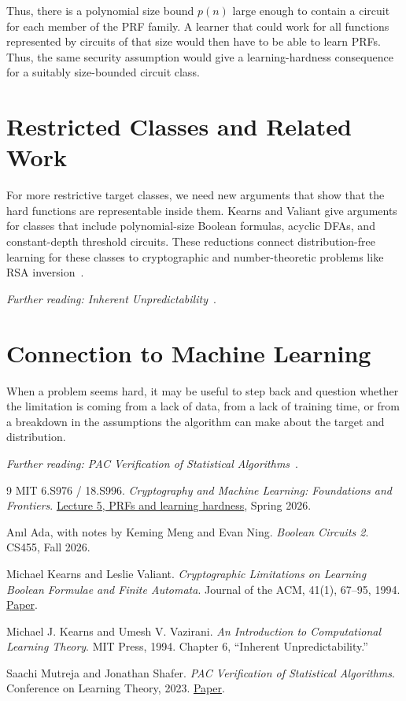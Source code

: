\documentclass[11pt,fleqn]{article}
\begin{document}
Thus, there is a polynomial size bound $p(n)$ large enough to contain a circuit for each member of the PRF family. A learner that could work for all functions represented by circuits of that size would then have to be able to learn PRFs. Thus, the same security assumption would give a learning-hardness consequence for a suitably size-bounded circuit class.

\section{Restricted Classes and Related Work}

For more restrictive target classes, we need new arguments that show that the hard functions are representable inside them. Kearns and Valiant give arguments for classes that include polynomial-size Boolean formulas, acyclic DFAs, and constant-depth threshold circuits. These reductions connect distribution-free learning for these classes to cryptographic and number-theoretic problems like RSA inversion~\cite{valiant}.

\emph{Further reading: Inherent Unpredictability}~\cite{vazirani}.

\section{Connection to Machine Learning}

When a problem seems hard, it may be useful to step back and question whether the limitation is coming from a lack of data, from a lack of training time, or from a breakdown in the assumptions the algorithm can make about the target and distribution.

\emph{Further reading: PAC Verification of Statistical Algorithms}~\cite{verification}.

\begin{thebibliography}{9}
MIT 6.S976 / 18.S996.
\emph{Cryptography and Machine Learning: Foundations and Frontiers}.
\href{https://mlcrypto.mit.edu/course/slides/lec5.pdf#page=47}
{Lecture 5, PRFs and learning hardness}, Spring 2026.

An{\i}l Ada, with notes by Keming Meng and Evan Ning.
\emph{Boolean Circuits 2}. CS455, Fall 2026.

Michael Kearns and Leslie Valiant.
\emph{Cryptographic Limitations on Learning Boolean Formulae and
Finite Automata}. Journal of the ACM, 41(1), 67--95, 1994.
\href{https://www.cis.upenn.edu/~mkearns/papers/cryptojacm.pdf}
{Paper}.

Michael J. Kearns and Umesh V. Vazirani.
\emph{An Introduction to Computational Learning Theory}.
MIT Press, 1994. Chapter 6, ``Inherent Unpredictability.''

Saachi Mutreja and Jonathan Shafer.
\emph{PAC Verification of Statistical Algorithms}.
Conference on Learning Theory, 2023.
\href{https://proceedings.mlr.press/v195/mutreja23a.html}{Paper}.
\end{thebibliography}
\end{document}
